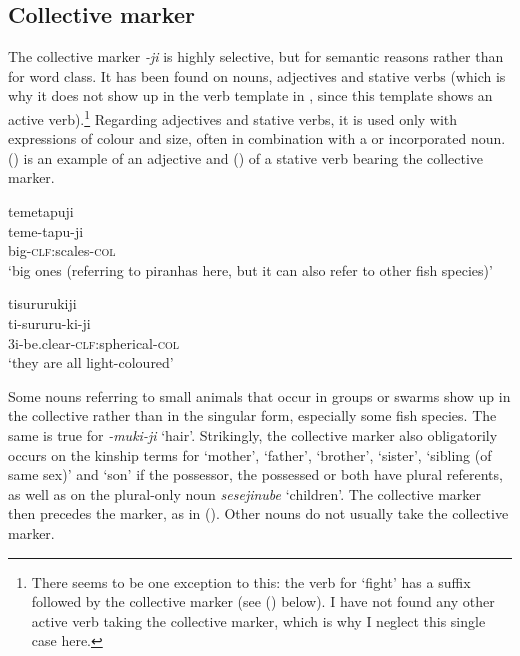 \subsection{Collective marker}\label{sec:AffClCollective}

The collective marker \textit{-ji} is highly selective, but for semantic reasons rather than for word class. It has been found on nouns, adjectives and stative verbs (which is why it does not show up in the verb template in , since this template shows an active verb).\footnote{There seems to be one exception to this: the verb for ‘fight’ has a  suffix followed by the collective marker (see () below). I have not found any other active verb taking the collective marker, which is why I neglect this single case here. } Regarding adjectives and stative verbs, it is used only with expressions of colour and size, often in combination with a  or incorporated noun. () is an example of an adjective and () of a stative verb bearing the collective marker.

\ea\label{ex:FirstCol-1}
\begingl
\glpreamble temetapuji\\
\gla teme-tapu-ji\\
\glb big-\textsc{clf:}scales-\textsc{col}\\
\glft ‘big ones (referring to piranhas here, but it can also refer to other fish species)’
\endgl
\trailingcitation{[cux-c120414ls-2.014]}
\xe 

\ea\label{ex:FirstCol-2}
\begingl
\glpreamble tisururukiji\\
\gla ti-sururu-ki-ji\\
\glb 3i-be.clear-\textsc{clf:}spherical-\textsc{col}\\
\glft ‘they are all light-coloured’
\endgl
\trailingcitation{[jxx-e150925l-1.164]}
\xe

Some nouns referring to small animals that occur in groups or swarms show up in the collective rather than in the singular form, especially some fish species. The same is true for \textit{-muki-ji} ‘hair’. Strikingly, the collective marker also obligatorily occurs on the kinship terms for ‘mother’, ‘father’, ‘brother’, ‘sister’, ‘sibling (of same sex)’ and ‘son’ if the possessor, the possessed or both have plural referents, as well as on the plural-only noun \textit{sesejinube} ‘children’. The collective marker then precedes the  marker, as in (). Other nouns do not usually take the collective marker.

